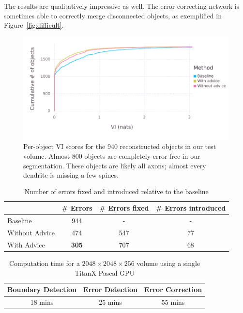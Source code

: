 \documentclass{article}
\begin{document}
The results are qualitatively impressive as well. The error-correcting network
is sometimes able to correctly merge disconnected objects, as exemplified in
Figure~\ref{fig:difficult}.

\begin{figure}
\begin{center}
\includegraphics[width=0.9\linewidth]{per_object_vi.pdf}
\caption{Per-object VI scores for the 940 reconstructed objects in our test volume. Almost 800 objects are completely error free in our segmentation. These objects are likely all axons; almost every dendrite is missing a few spines.}
\label{fig:decomp_vi_scores}
\end{center}
\end{figure}

\begin{table}[h]
  \caption{Number of errors fixed and introduced relative to the baseline}
  \label{table:errors_fixed}
  \centering
  \begin{tabular}{lccc}
    \toprule
	& \# Errors & \# Errors fixed & \# Errors introduced\\
    \midrule
    Baseline & 944 & - & - \\
    Without Advice & 474 & 547 & 77\\
	With Advice & \textbf{305} & 707 & 68\\
    \bottomrule
  \end{tabular}
\end{table}


\begin{table}[!h]
	\caption{Computation time for a $2048\times 2048\times 256$ volume using a single TitanX Pascal GPU}
\label{table:timing}
  \centering
  \begin{tabular}{ccc}
	  \toprule
	Boundary Detection & Error Detection & Error Correction\\
	\midrule
	18 mins & 25 mins & 55 mins\\
	\bottomrule
  \end{tabular}
\end{table}
\end{document}
